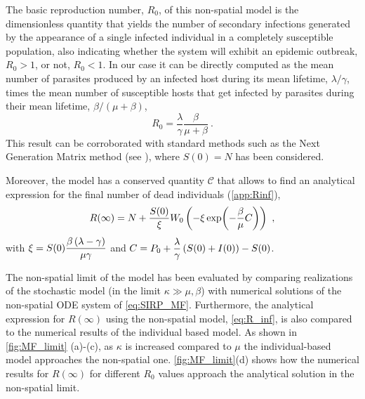 The basic reproduction number, $R_0$, of this non-spatial model is the
dimensionless quantity that yields the number of secondary infections generated
by the appearance of a single infected individual in a completely susceptible
population, also indicating whether the system will exhibit an epidemic
outbreak, $R_0>1$, or not, $R_0<1$.
In our case it can be directly computed as the mean number of parasites
produced by an infected host during its mean lifetime, $\lambda/\gamma$, times
the mean number of susceptible hosts that get infected by parasites during
their mean lifetime, $\beta/(\mu+\beta)$,
\begin{equation}\label{eq:R0_MF}
    R_0=\frac{\lambda}{\gamma}\frac{\beta}{\mu+\beta} \ .
\end{equation}
This result can be corroborated with standard methods such as the Next
Generation Matrix method \cite{Diekmann2010} (see \cite{GimenezRomero2021}),
where $S(0)=N$ has been considered.

Moreover, the model has a conserved quantity $\mathcal{C}$
\cite{GimenezRomero2021} that allows to find an analytical expression for the
final number of dead individuals (\cref{app:Rinf}),
\begin{equation}\label{eq:R_inf}
    R(\infty)=N+\frac{S(0)}{\xi}W_0\left(-\xi\exp(-\frac{\beta}{\mu}C)\right) \
    ,
\end{equation}
with $\displaystyle\xi=S(0)\frac{\beta\left(\lambda-\gamma\right)}{\mu\gamma}$
and $\displaystyle C=P_0+\frac{\lambda}{\gamma}\left(S(0)+I(0)\right)-S(0)$.

The non-spatial limit of the model has been evaluated by comparing realizations
of the stochastic model (in the limit $\kappa\gg\mu,\beta$) with numerical
solutions of the non-spatial ODE system of \cref{eq:SIRP_MF}. Furthermore, the
analytical expression for $R(\infty)$ using the non-spatial model,
\cref{eq:R_inf}, is also compared to the numerical results of the individual
based model. As shown in \cref{fig:MF_limit} (a)-(c), as $\kappa$ is increased
compared to $\mu$ the individual-based model approaches the non-spatial one.
\cref{fig:MF_limit}(d) shows how the numerical results for $R(\infty)$ for
different $R_0$ values approach the analytical solution in the non-spatial
limit.

